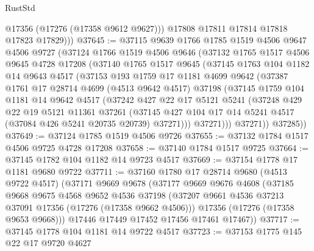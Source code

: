\begin{lexlean}{RustStd}
\begin{coremodule}
            @17356
            (@17276 (@17358 @9612 @9627)))
          @17808
          @17811
          @17814
          @17818
          @17823
          @17829)))
@37645 := @37115
    @9639
    @1766
    @1785
    @1519
    @4506
    @9647
    @4506
    @9727
    (@37124
      @1766
      @1519
      @4506
      @9646
      (@37132
        @1765
        @1517
        @4506
        @9645
        @4728
        @17208
        (@37140
          @1765
          @1517
          @9645
          (@37145
            @1763
            @104
            @1182
            @14
            @9643
            @4517
            (@37153
              @193
              @1759
              @17
              @1181
              @4699
              @9642
              (@37387
                @1761
                @17
                @28714
                @4699
                (@4513 @9642 @4517)
                @37198
                (@37145
                  @1759
                  @104
                  @1181
                  @14
                  @9642
                  @4517
                  (@37242
                    @427
                    @22
                    @17
                    @5121
                    @5241
                    (@37248
                      @429
                      @22
                      @19
                      @5121
                      @11361
                      @37261
                      (@37145
                        @427
                        @104
                        @17
                        @14
                        @5241
                        @4517
                        (@37084 @426 @5241 @20735 @20739)
                        @37271)))
                  @37271)))
            @37271))
        @37285))
@37649 := @37124 @1785 @1519 @4506 @9726
@37655 := @37132 @1784 @1517 @4506 @9725 @4728 @17208
@37658 := @37140 @1784 @1517 @9725
@37664 := @37145 @1782 @104 @1182 @14 @9723 @4517
@37669 := @37154 @1778 @17 @1181 @9680 @9722
@37711 := @37160
    @1780
    @17
    @28714
    @9680
    (@4513 @9722 @4517)
    (@37171
      @9669
      @9678
      (@37177
        @9669
        @9676
        @4608
        (@37185
          @9668
          @9675
          @4568
          @9652
          @4536
          @37198
          (@37207 @9661 @4536 @37213 @37091 @17356 (@17276 (@17358 @9662 @4506)))
          @17356
          (@17276 (@17358 @9653 @9668)))
        @17446
        @17449
        @17452
        @17456
        @17461
        @17467))
@37717 := @37145 @1778 @104 @1181 @14 @9722 @4517
@37723 := @37153 @1775 @145 @22 @17 @9720 @4627

\end{coremodule}
\end{lexlean}
